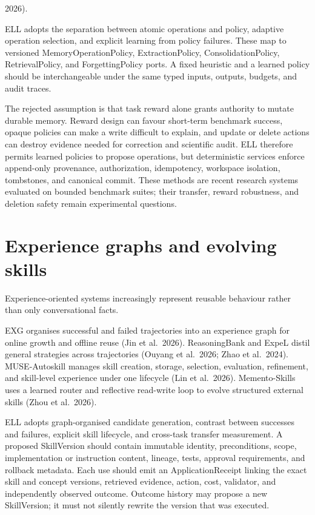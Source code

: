 \documentclass[
  english,
  a4paper,
  DIV=11,
  numbers=noendperiod]{scrreprt}
\begin{document}
2026).

ELL adopts the separation between atomic operations and policy, adaptive
operation selection, and explicit learning from policy failures. These
map to versioned MemoryOperationPolicy, ExtractionPolicy,
ConsolidationPolicy, RetrievalPolicy, and ForgettingPolicy ports. A
fixed heuristic and a learned policy should be interchangeable under the
same typed inputs, outputs, budgets, and audit traces.

The rejected assumption is that task reward alone grants authority to
mutate durable memory. Reward design can favour short-term benchmark
success, opaque policies can make a write difficult to explain, and
update or delete actions can destroy evidence needed for correction and
scientific audit. ELL therefore permits learned policies to propose
operations, but deterministic services enforce append-only provenance,
authorization, idempotency, workspace isolation, tombstones, and
canonical commit. These methods are recent research systems evaluated on
bounded benchmark suites; their transfer, reward robustness, and
deletion safety remain experimental questions.

\section{Experience graphs and evolving
skills}\label{experience-graphs-and-evolving-skills}

Experience-oriented systems increasingly represent reusable behaviour
rather than only conversational facts.

EXG organises successful and failed trajectories into an experience
graph for online growth and offline reuse (Jin et al.~2026).
ReasoningBank and ExpeL distil general strategies across trajectories
(Ouyang et al.~2026; Zhao et al.~2024). MUSE-Autoskill manages skill
creation, storage, selection, evaluation, refinement, and skill-level
experience under one lifecycle (Lin et al.~2026). Memento-Skills uses a
learned router and reflective read-write loop to evolve structured
external skills (Zhou et al.~2026).

ELL adopts graph-organised candidate generation, contrast between
successes and failures, explicit skill lifecycle, and cross-task
transfer measurement. A proposed SkillVersion should contain immutable
identity, preconditions, scope, implementation or instruction content,
lineage, tests, approval requirements, and rollback metadata. Each use
should emit an ApplicationReceipt linking the exact skill and concept
versions, retrieved evidence, action, cost, validator, and independently
observed outcome. Outcome history may propose a new SkillVersion; it
must not silently rewrite the version that was executed.
\end{document}

